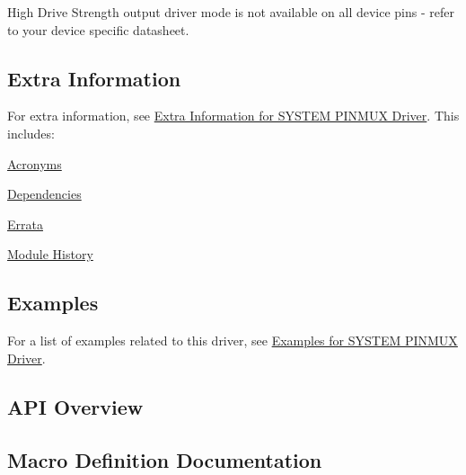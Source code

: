 High Drive Strength output driver mode is not available on all device pins -\/ refer to your device specific datasheet.\hypertarget{group__asfdoc__sam0__system__pinmux__group_asfdoc_sam0_system_pinmux_extra_info}{}\subsection{Extra Information}\label{group__asfdoc__sam0__system__pinmux__group_asfdoc_sam0_system_pinmux_extra_info}
For extra information, see \hyperlink{asfdoc_sam0_system_pinmux_extra}{Extra Information for S\+Y\+S\+T\+E\+M P\+I\+N\+M\+U\+X Driver}. This includes\+:
\begin{DoxyItemize}
\item \hyperlink{asfdoc_sam0_system_pinmux_extra_asfdoc_sam0_system_pinmux_extra_acronyms}{Acronyms}
\item \hyperlink{asfdoc_sam0_system_pinmux_extra_asfdoc_sam0_system_pinmux_extra_dependencies}{Dependencies}
\item \hyperlink{asfdoc_sam0_system_pinmux_extra_asfdoc_sam0_system_pinmux_extra_errata}{Errata}
\item \hyperlink{asfdoc_sam0_system_pinmux_extra_asfdoc_sam0_system_pinmux_extra_history}{Module History}
\end{DoxyItemize}\hypertarget{group__asfdoc__sam0__system__pinmux__group_asfdoc_sam0_system_pinmux_examples}{}\subsection{Examples}\label{group__asfdoc__sam0__system__pinmux__group_asfdoc_sam0_system_pinmux_examples}
For a list of examples related to this driver, see \hyperlink{asfdoc_sam0_system_pinmux_exqsg}{Examples for S\+Y\+S\+T\+E\+M P\+I\+N\+M\+U\+X Driver}.\hypertarget{group__asfdoc__sam0__system__pinmux__group_asfdoc_sam0_system_pinmux_api_overview}{}\subsection{A\+P\+I Overview}\label{group__asfdoc__sam0__system__pinmux__group_asfdoc_sam0_system_pinmux_api_overview}


\subsection{Macro Definition Documentation}
\hypertarget{group__asfdoc__sam0__system__pinmux__group_gaf212e7bc2a29cb57ab7b1130e4404a6b}{}
